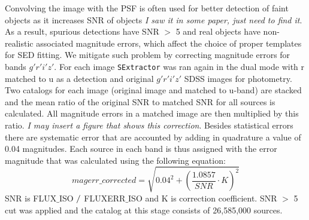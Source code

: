 \documentclass[numberedappendix,apj,twocolumn]{emulateapj}
\begin{document}
Convolving the image with the PSF is often used for better detection of faint objects as it increases SNR of objects \textit{I saw it in some paper, just need to find it}. As a result, spurious detections have SNR $>$ 5 and real objects have non-realistic associated magnitude errors, which affect the choice of proper templates for SED fitting. We mitigate such problem by correcting magnitude errors for bands $g'r'i'z'$. For each image {\tt SExtractor} was ran again in the dual mode with r matched to u as a detection and original $g'r'i'z'$ SDSS images for photometry. Two catalogs for each image (original image and matched to u-band) are stacked and the mean ratio of the original SNR to matched SNR for all sources is calculated. All magnitude errors in a matched image are then multiplied by this ratio. \textit{I may insert a figure that shows this correction}. Besides statistical errors there are systematic error that are accounted by adding in quadrature a value of 0.04 magnitudes. Each source in each band is thus assigned with the error magnitude that was calculated using the following equation:
$$ magerr\_corrected = \sqrt{0.04^{2}+(\dfrac{1.0857}{SNR}\cdot K)^{2}} $$ SNR is FLUX$\_$ISO $ \//$ FLUXERR$\_$ISO and K is correction coefficient. SNR $>$ 5 cut was applied and the catalog at this stage consists of 26,585,000 sources. 

\end{document}

